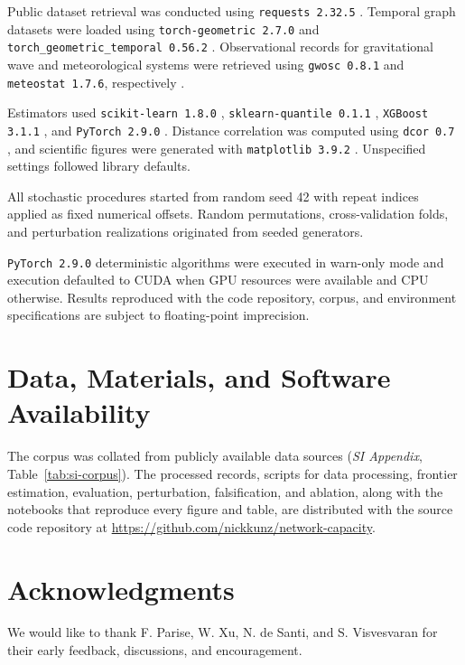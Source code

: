 \documentclass{article}
\begin{document}
Public dataset retrieval was conducted using \texttt{requests 2.32.5} \citep{ref120}. Temporal graph datasets were loaded using \texttt{torch-geometric 2.7.0} \citep{ref89,ref99} and \texttt{torch\_geometric\_temporal 0.56.2} \citep{ref90,ref100}. Observational records for gravitational wave and meteorological systems were retrieved using \texttt{gwosc 0.8.1} and \texttt{meteostat 1.7.6}, respectively \citep{ref116,ref117}.

Estimators used \texttt{scikit-learn 1.8.0} \citep{ref72,ref94}, \texttt{sklearn-quantile 0.1.1} \citep{ref87}, \texttt{XGBoost 3.1.1} \citep{ref39,ref95}, and \texttt{PyTorch 2.9.0} \citep{ref85,ref115}. Distance correlation was computed using \texttt{dcor 0.7} \citep{ref88}, and scientific figures were generated with \texttt{matplotlib 3.9.2} \citep{ref92,ref101}. Unspecified settings followed library defaults.

All stochastic procedures started from random seed 42 with repeat indices applied as fixed numerical offsets. Random permutations, cross-validation folds, and perturbation realizations originated from seeded generators. 

\texttt{PyTorch 2.9.0} deterministic algorithms were executed in warn-only mode and execution defaulted to CUDA when GPU resources were available and CPU otherwise. Results reproduced with the code repository, corpus, and environment specifications are subject to floating-point imprecision.
\clearpage

\section*{Data, Materials, and Software Availability}
\label{sec:data}
\label{sec:code}
The corpus was collated from publicly available data sources (\textit{SI Appendix}, Table~\ref{tab:si-corpus}). The processed records, scripts for data processing, frontier estimation, evaluation, perturbation, falsification, and ablation, along with the notebooks that reproduce every figure and table, are distributed with the source code repository at \url{https://github.com/nickkunz/network-capacity}.

\section*{Acknowledgments}
\label{sec:acknowledge}
We would like to thank F. Parise, W. Xu, N. de Santi, and S. Visvesvaran for their early feedback, discussions, and encouragement.
\end{document}
